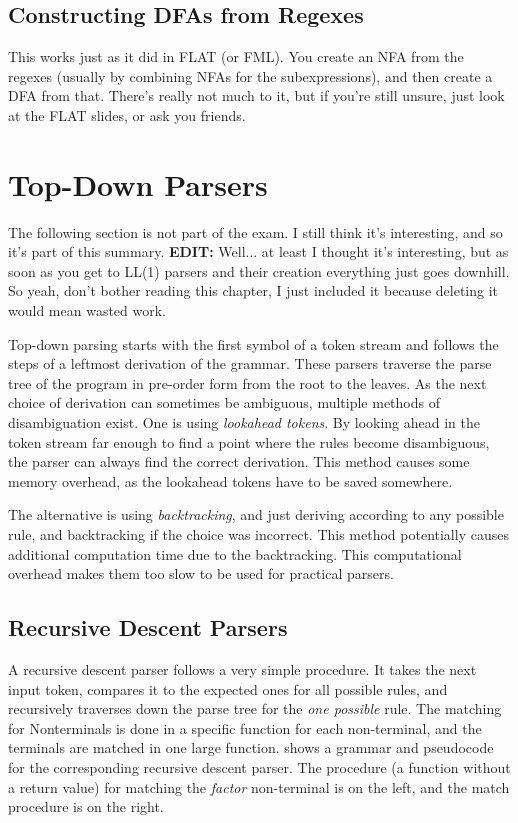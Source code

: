 \documentclass{article}
\begin{document}
\subsection{Constructing DFAs from Regexes}
This works just as it did in FLAT (or FML).
You create an NFA from the regexes (usually by combining NFAs for the subexpressions), and then create a DFA from that.
There's really not much to it, but if you're still unsure, just look at the FLAT slides, or ask you friends.

\section{Top-Down Parsers}
\begin{keypointbox}
	The following section is not part of the exam.
	I still think it's interesting, and so it's part of this summary.
	\textbf{EDIT:} Well... at least I thought it's interesting, but as soon as you get to LL(1) parsers and their creation everything just goes downhill.
	So yeah, don't bother reading this chapter, I just included it because deleting it would mean wasted work.
\end{keypointbox}

Top-down parsing starts with the first symbol of a token stream and follows the steps of a leftmost derivation of the grammar.
These parsers traverse the parse tree of the program in pre-order form from the root to the leaves.
As the next choice of derivation can sometimes be ambiguous, multiple methods of disambiguation exist.
One is using \emph{lookahead tokens}.
By looking ahead in the token stream far enough to find a point where the rules become disambiguous, the parser can always find the correct derivation.
This method causes some memory overhead, as the lookahead tokens have to be saved somewhere.

The alternative is using \emph{backtracking}, and just deriving according to any possible rule, and backtracking if the choice was incorrect.
This method potentially causes additional computation time due to the backtracking.
This computational overhead makes them too slow to be used for practical parsers.

\subsection{Recursive Descent Parsers}
A recursive descent parser follows a very simple procedure.
It takes the next input token, compares it to the expected ones for all possible rules, and recursively traverses down the parse tree for the \emph{one possible} rule.
The matching for Nonterminals is done in a specific function for each non-terminal, and the terminals are matched in one large function.
 shows a grammar and pseudocode for the corresponding recursive descent parser.
The procedure (a function without a return value) for matching the \emph{factor} non-terminal is on the left, and the match procedure is on the right.
\end{document}
